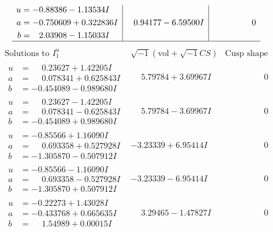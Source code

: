 \documentclass[1p]{elsarticle_modified}
\theoremstyle{definition}
\newcommand{\I}{\sqrt{-1}}
\begin{document}
$$\begin{array}{c|c|c}
\begin{aligned}
u &= -0.88386 - 1.13534 I \\
a &= -0.750609 + 0.322836 I \\
b &= \phantom{-}2.03908 - 1.15033 I\end{aligned}
 & \phantom{-}0.94177 - 6.59500 I & \phantom{-0.000000 } 0\\
 \hline 
 \end{array}$$\newpage$$\begin{array}{c|c|c}  
\text{Solutions to }I^u_{1}& \I (\text{vol} + \sqrt{-1}CS) & \text{Cusp shape}\\
 \hline 
\begin{aligned}
u &= \phantom{-}0.23627 + 1.42205 I \\
a &= \phantom{-}0.078341 + 0.625843 I \\
b &= -0.454089 - 0.989680 I\end{aligned}
 & \phantom{-}5.79784 + 3.69967 I & \phantom{-0.000000 } 0 \\ \hline\begin{aligned}
u &= \phantom{-}0.23627 - 1.42205 I \\
a &= \phantom{-}0.078341 - 0.625843 I \\
b &= -0.454089 + 0.989680 I\end{aligned}
 & \phantom{-}5.79784 - 3.69967 I & \phantom{-0.000000 } 0 \\ \hline\begin{aligned}
u &= -0.85566 + 1.16090 I \\
a &= \phantom{-}0.693358 + 0.527928 I \\
b &= -1.305870 - 0.507912 I\end{aligned}
 & -3.23339 + 6.95414 I & \phantom{-0.000000 } 0 \\ \hline\begin{aligned}
u &= -0.85566 - 1.16090 I \\
a &= \phantom{-}0.693358 - 0.527928 I \\
b &= -1.305870 + 0.507912 I\end{aligned}
 & -3.23339 - 6.95414 I & \phantom{-0.000000 } 0 \\ \hline\begin{aligned}
u &= -0.22273 + 1.43028 I \\
a &= -0.433768 + 0.665635 I \\
b &= \phantom{-}1.54989 + 0.00015 I\end{aligned}
 & \phantom{-}3.29465 - 1.47827 I & \phantom{-0.000000 } 0 \\ \hline\begin{aligned}

\end{aligned}
\end{array}$$
\end{document}
